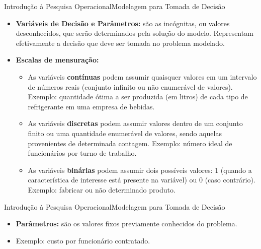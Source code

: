 \documentclass[t]{beamer}
\begin{document}
\begin{ftst}{Introdução à Pesquisa Operacional}{Modelagem para Tomada de Decisão}
\small
\begin{itemize}
    \item[\textbf{a.}] \textbf{Variáveis de Decisão e Parâmetros: }são as incógnitas, ou valores desconhecidos, que serão determinados pela solução do modelo. Representam efetivamente a decisão que deve ser tomada no problema modelado.
    
    \item  \textbf{Escalas de mensuração:}
    \begin{itemize}
        \footnotesize
        \item As variáveis \textbf{contínuas} podem assumir quaisquer valores em um intervalo de números reais (conjunto infinito ou não enumerável de valores). Exemplo: quantidade ótima a ser produzida (em litros) de cada tipo de refrigerante em uma empresa de bebidas.
        \item As variáveis \textbf{discretas} podem assumir valores dentro de um conjunto finito ou uma quantidade enumerável de valores, sendo aquelas provenientes de determinada contagem. Exemplo:  número ideal de funcionários por turno de trabalho.
        \item As variáveis \textbf{binárias} podem assumir dois possíveis valores: 1 (quando a característica de interesse está presente na variável) ou 0 (caso contrário). Exemplo: fabricar ou não determinado produto.
    \end{itemize}
\end{itemize}

\end{ftst}


\begin{ftst}{Introdução à Pesquisa Operacional}{Modelagem para Tomada de Decisão}
\small
\begin{itemize}
    \item[\textbf{b.}] \textbf{Parâmetros:} são os valores fixos previamente conhecidos do problema.
    \vone
    \item Exemplo: custo por funcionário contratado.
\end{itemize}

\end{ftst}

\end{document}
